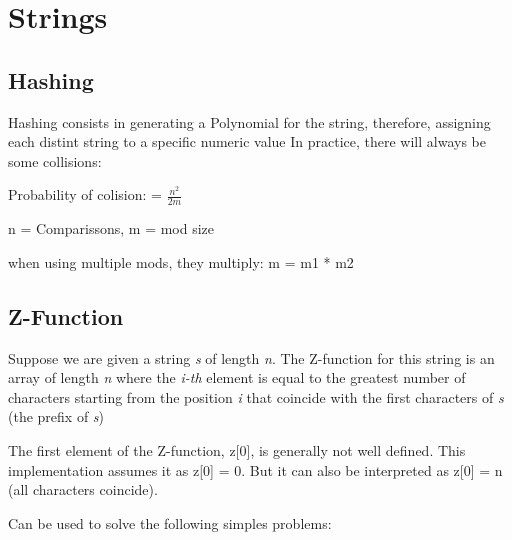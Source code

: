 \chapter{Strings}

\section{Hashing}

    Hashing consists in generating a Polynomial for the string, 
    therefore, assigning each distint string to a specific numeric value
    In practice, there will always be some collisions:

    Probability of colision: = $ \frac{n^2}{2 m} $

    n = Comparissons, m = mod size

    when using multiple mods, they multiply: m = m1 * m2


\section{Z-Function}

    Suppose we are given a string \textit{s} of length \textit{n}. 
    The Z-function for this string is an array of length \textit{n} where the \textit{i-th}
    element is equal to the greatest number of characters starting from the position \textit{i}
    that coincide with the first characters of \textit{s} (the prefix of \textit{s})

    The first element of the Z-function, z[0], is generally not well defined. 
    This implementation assumes it as z[0] = 0. 
    But it can also be interpreted as z[0] = n (all characters coincide).

    Can be used to solve the following simples problems:

